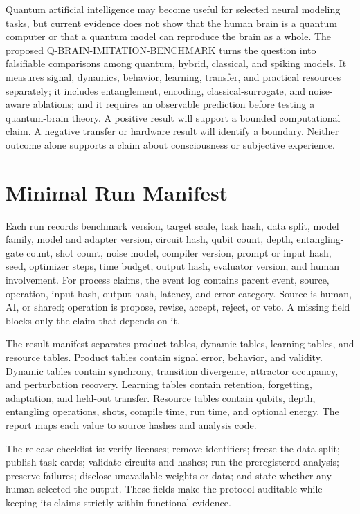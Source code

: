 \documentclass[conference]{IEEEtran}
\begin{document}
Quantum artificial intelligence may become useful for selected neural modeling tasks,
but current evidence does not show that the human brain is a quantum computer or that a
quantum model can reproduce the brain as a whole. The proposed Q-BRAIN-IMITATION-BENCHMARK
turns the question into falsifiable comparisons among quantum, hybrid, classical, and
spiking models. It measures signal, dynamics, behavior, learning, transfer, and practical
resources separately; it includes entanglement, encoding, classical-surrogate, and
noise-aware ablations; and it requires an observable prediction before testing a
quantum-brain theory. A positive result will support a bounded computational claim. A
negative transfer or hardware result will identify a boundary. Neither outcome alone
supports a claim about consciousness or subjective experience.

\appendices
\section{Minimal Run Manifest}
\label{sec:appendix}

Each run records benchmark version, target scale, task hash, data split, model family,
model and adapter version, circuit hash, qubit count, depth, entangling-gate count,
shot count, noise model, compiler version, prompt or input hash, seed, optimizer steps,
time budget, output hash, evaluator version, and human involvement. For process claims,
the event log contains parent event, source, operation, input hash, output hash, latency,
and error category. Source is human, AI, or shared; operation is propose, revise,
accept, reject, or veto. A missing field blocks only the claim that depends on it.

The result manifest separates product tables, dynamic tables, learning tables, and
resource tables. Product tables contain signal error, behavior, and validity. Dynamic
tables contain synchrony, transition divergence, attractor occupancy, and perturbation
recovery. Learning tables contain retention, forgetting, adaptation, and held-out
transfer. Resource tables contain qubits, depth, entangling operations, shots, compile
time, run time, and optional energy. The report maps each value to source hashes and
analysis code.

The release checklist is: verify licenses; remove identifiers; freeze the data split;
publish task cards; validate circuits and hashes; run the preregistered analysis;
preserve failures; disclose unavailable weights or data; and state whether any human
selected the output. These fields make the protocol auditable while keeping its claims
strictly within functional evidence.
\end{document}
